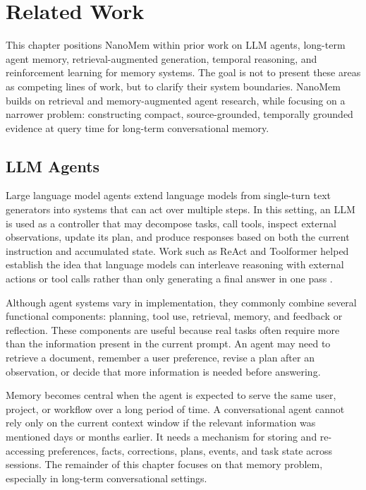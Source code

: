 \chapter{Related Work}
\label{chap:related-work}

This chapter positions NanoMem within prior work on LLM agents, long-term
agent memory, retrieval-augmented generation, temporal reasoning, and
reinforcement learning for memory systems. The goal is not to present these
areas as competing lines of work, but to clarify their system boundaries.
NanoMem builds on retrieval and memory-augmented agent research, while focusing
on a narrower problem: constructing compact, source-grounded, temporally
grounded evidence at query time for long-term conversational memory.

\section{LLM Agents}
\label{sec:rw-llm-agents}

Large language model agents extend language models from single-turn text
generators into systems that can act over multiple steps. In this setting, an
LLM is used as a controller that may decompose tasks, call tools, inspect
external observations, update its plan, and produce responses based on both the
current instruction and accumulated state. Work such as ReAct and Toolformer
helped establish the idea that language models can interleave reasoning with
external actions or tool calls rather than only generating a final answer in
one pass \cite{yao2023react,schick2023toolformer}.

Although agent systems vary in implementation, they commonly combine several
functional components: planning, tool use, retrieval, memory, and feedback or
reflection. These components are useful because real tasks often require more
than the information present in the current prompt. An agent may need to
retrieve a document, remember a user preference, revise a plan after an
observation, or decide that more information is needed before answering.

Memory becomes central when the agent is expected to serve the same user,
project, or workflow over a long period of time. A conversational agent cannot
rely only on the current context window if the relevant information was
mentioned days or months earlier. It needs a mechanism for storing and
re-accessing preferences, facts, corrections, plans, events, and task state
across sessions. The remainder of this chapter focuses on that memory problem,
especially in long-term conversational settings.

